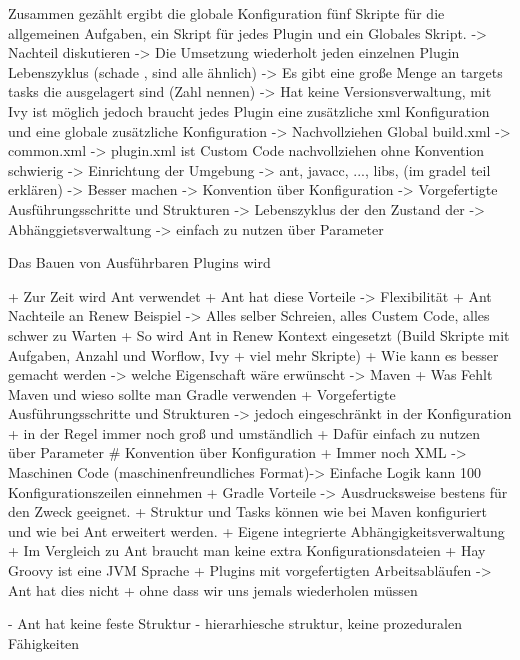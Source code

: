 	Zusammen gezählt ergibt die globale Konfiguration fünf Skripte für die allgemeinen Aufgaben, ein Skript für jedes Plugin und ein Globales Skript. 
		-> Nachteil diskutieren
			-> Die Umsetzung wiederholt jeden einzelnen Plugin Lebenszyklus (schade , sind alle ähnlich)
			-> Es gibt eine große Menge an targets tasks die ausgelagert sind (Zahl nennen) 
			-> Hat keine Versionsverwaltung, mit Ivy ist möglich jedoch braucht jedes Plugin eine zusätzliche xml Konfiguration und eine globale zusätzliche Konfiguration 
			-> Nachvollziehen Global build.xml -> common.xml -> plugin.xml  ist Custom Code nachvollziehen ohne Konvention schwierig 
			-> Einrichtung der Umgebung -> ant, javacc, ..., libs, (im gradel teil erklären)
		-> Besser machen   
			-> Konvention über Konfiguration
				-> Vorgefertigte Ausführungsschritte und Strukturen
				-> Lebenszyklus der den Zustand der 
			-> Abhänggietsverwaltung 
			-> einfach zu nutzen über Parameter 





		Das Bauen von Ausführbaren Plugins wird  


		+ Zur Zeit wird Ant verwendet 
			+ Ant hat diese Vorteile -> Flexibilität
			+ Ant Nachteile an Renew Beispiel -> Alles selber Schreien, alles Custem Code, alles schwer zu Warten
			+ So wird Ant in Renew Kontext eingesetzt (Build Skripte mit Aufgaben, Anzahl und Worflow, Ivy + viel mehr Skripte)
			+ Wie kann es besser gemacht werden -> welche Eigenschaft wäre erwünscht -> Maven
		+ Was Fehlt Maven und wieso sollte man Gradle verwenden
			+ Vorgefertigte Ausführungsschritte und Strukturen -> jedoch eingeschränkt in der Konfiguration 
			+ in der Regel immer noch groß und umständlich
			+ Dafür einfach zu nutzen über Parameter 
			# Konvention über Konfiguration
			+ Immer noch XML -> Maschinen Code (maschinenfreundliches Format)-> Einfache Logik kann 100 Konfigurationszeilen einnehmen 
		+ Gradle Vorteile -> Ausdrucksweise bestens für den Zweck geeignet. 
			+ Struktur und Tasks können wie bei Maven konfiguriert und wie bei Ant erweitert werden.
			+ Eigene integrierte Abhängigkeitsverwaltung 
			+ Im Vergleich zu Ant braucht man keine extra Konfigurationsdateien 
			+ Hay Groovy ist eine JVM Sprache 
			+ Plugins mit vorgefertigten Arbeitsabläufen -> Ant hat dies nicht 
			+ ohne dass wir uns jemals wiederholen müssen



		- Ant hat keine feste Struktur 
		- hierarhiesche struktur, keine prozeduralen Fähigkeiten

